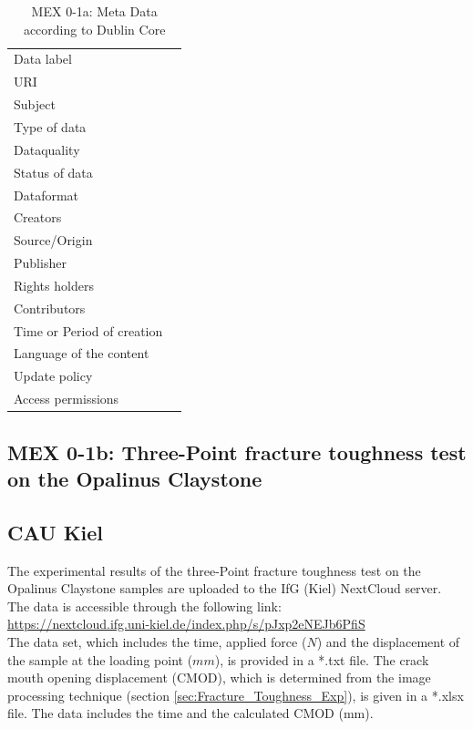\begin{table}[!ht]
\caption{MEX 0-1a: Meta Data according to Dublin Core}
\label{tab:dms-mex0-1a}
\small
\begin{tabular}{R{3cm}|L{7cm}}
\hline
%
Data label &  \\
URI &  \\
Subject  &  \\
Type of data  &  \\
Dataquality  &  \\
Status of data  &  \\
Dataformat  & \\
Creators  &  \\
Source/Origin &  \\
Publisher  &  \\
Rights holders &  \\
Contributors &  \\
Time or Period of creation &  \\
Language of the content &  \\
Update policy &  \\
Access permissions &  \\
%
\hline
\end{tabular}
\end{table}

\subsection{MEX 0-1b: Three-Point fracture toughness test on the Opalinus Claystone}

\subsection*{CAU Kiel}

The experimental results of the three-Point fracture toughness test on the Opalinus Claystone samples are uploaded to the IfG (Kiel) NextCloud server. The data is accessible through the following link:\\
\hyperlink{https://nextcloud.ifg.uni-kiel.de/index.php/s/pJxp2eNEJb6PfiS}{https://nextcloud.ifg.uni-kiel.de/index.php/s/pJxp2eNEJb6PfiS}\\

The data set, which includes the time, applied force ($N$) and the displacement of the sample at the loading point ($mm$), is provided in a *.txt file. The crack mouth opening displacement (CMOD), which is determined from the image processing technique (section \ref {sec:Fracture_Toughness_Exp}), is given in a *.xlsx file. The data includes the time and the calculated CMOD (mm). 

